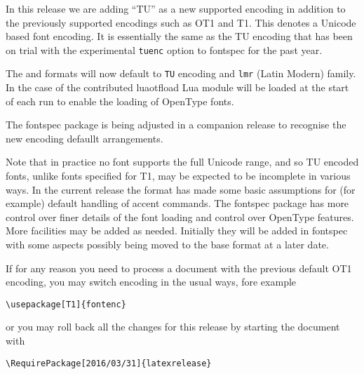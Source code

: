 \documentclass{ltnews}
\begin{document}
In this release we are adding ``TU'' as a new supported
encoding in addition to the previously supported encodings such as OT1
and T1. This denotes a Unicode based font encoding. It is essentially
the same as the TU encoding that has been on trial with the
experimental \texttt{tuenc} option to \textsf{fontspec} for the past
year.

The  and  formats will now default
to \texttt{TU} encoding and \texttt{lmr} (Latin Modern) family. In the
case of  the contributed \textsf{luaotfload} Lua
module will be loaded at the start of each run to enable the loading
of OpenType fonts.

The \textsf{fontspec} package is being adjusted in a companion release
to recognise the new encoding defaullt arrangements.

Note that in practice no font supports the full Unicode range, and so
TU encoded fonts, unlike fonts specified for T1, may be expected to
be incomplete in various ways. In the current release the format has 
made some basic assumptions for (for example) default handling of
accent commands. The \textsf{fontspec} package has more control over
finer details of the font loading and control over OpenType
features. More facilities may be added as needed. Initially they will
be added in \textsf{fontspec} with some aspects possibly being moved
to the base format at a later date.

If for any reason you need to process a document with the previous
default OT1 encoding, you may switch encoding in the usual ways, fore
example
\begin{verbatim}
\usepackage[T1]{fontenc}
\end{verbatim}
or you may roll back all the changes for this release by starting the
document with
\begin{verbatim}
\RequirePackage[2016/03/31]{latexrelease}
\end{verbatim}
\end{document}
